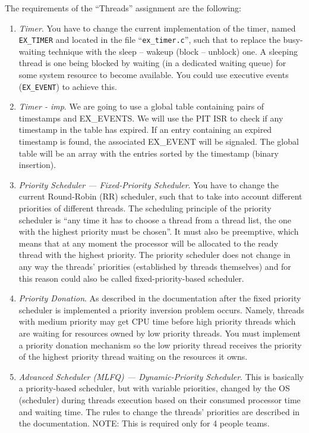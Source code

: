 The requirements of the ``Threads'' assignment are the following:
\begin{enumerate}
    \item \textit{Timer}. You have to change the current implementation of the timer, named \texttt{EX\_TIMER} and located in the file ``\texttt{ex\_timer.c}'', such that to replace the busy-waiting technique with the sleep -- wakeup (block -- unblock) one. A sleeping thread is one being blocked by waiting (in a dedicated waiting queue) for some system resource to become available. You could use executive events (\texttt{EX\_EVENT}) to achieve this.

    \item \textit{Timer - imp}. We are going to use a global table containing pairs of timestamps and EX_EVENTS. We will use the PIT ISR to check if any timestamp
    in the table has expired. If an entry containing an expired timestamp is found, the associated EX_EVENT will be signaled.
    The global table will be an array with the entries sorted by the timestamp (binary insertion).
    
    \item \textit{Priority Scheduler --- Fixed-Priority Scheduler}. You have to change the current Round-Robin (RR) scheduler, such that to take into account different priorities of different threads. The scheduling principle of the priority scheduler is ``any time it has to choose a thread from a thread list, the one with the highest priority must be chosen''. It must also be preemptive, which means that at any moment the processor will be allocated to the ready thread with the highest priority. The priority scheduler does not change in any way the threads' priorities (established by threads themselves) and for this reason could also be called fixed-priority-based scheduler. 

    \item \textit{Priority Donation}. As described in the \OSName{} documentation after the fixed priority scheduler is implemented a priority inversion problem occurs. Namely, threads with medium priority may get CPU time before high priority threads which are waiting for resources owned by low priority threads. You must implement a priority donation mechanism so the low priority thread receives the priority of the highest priority thread waiting on the resources it owns.
    
    \item \textit{Advanced Scheduler (MLFQ) --- Dynamic-Priority Scheduler}. This is basically a priority-based scheduler, but with variable priorities, changed by the OS (scheduler) during threads execution based on their consumed processor time and waiting time. The rules to change the threads' priorities are described in the \OSName{} documentation. NOTE: This is required only for 4 people teams.

\end{enumerate}


